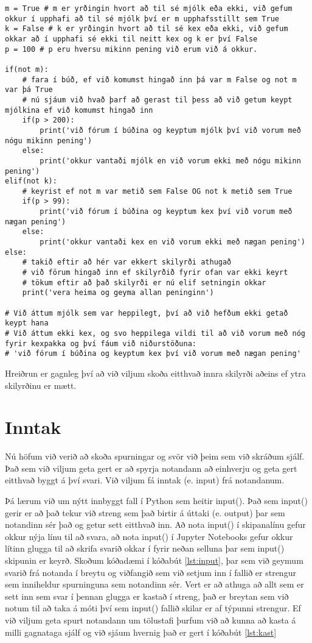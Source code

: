 \begin{lstlisting}[caption=Hreiðrun, label=lst:nesting]
m = True # m er yrðingin hvort að til sé mjólk eða ekki, við gefum okkur í upphafi að til sé mjólk því er m upphafsstillt sem True
k = False # k er yrðingin hvort að til sé kex eða ekki, við gefum okkar að í upphafi sé ekki til neitt kex og k er því False
p = 100 # p eru hversu mikinn pening við erum við á okkur.

if(not m):
	# fara í búð, ef við komumst hingað inn þá var m False og not m var þá True
	# nú sjáum við hvað þarf að gerast til þess að við getum keypt mjólkina ef við komumst hingað inn
	if(p > 200):
		print('við fórum í búðina og keyptum mjólk því við vorum með nógu mikinn pening')
	else:
		print('okkur vantaði mjólk en við vorum ekki með nógu mikinn pening')
elif(not k):
	# keyrist ef not m var metið sem False OG not k metið sem True
	if(p > 99):
		print('við fórum í búðina og keyptum kex því við vorum með nægan pening')
	else:
		print('okkur vantaði kex en við vorum ekki með nægan pening')
else:
	# takið eftir að hér var ekkert skilyrði athugað
	# við förum hingað inn ef skilyrðið fyrir ofan var ekki keyrt
	# tökum eftir að það skilyrði er nú elif setningin okkar
	print('vera heima og geyma allan peninginn')

# Við áttum mjólk sem var heppilegt, því að við hefðum ekki getað keypt hana
# Við áttum ekki kex, og svo heppilega vildi til að við vorum með nóg fyrir kexpakka og því fáum við niðurstöðuna:
# 'við fórum í búðina og keyptum kex því við vorum með nægan pening'
\end{lstlisting}

Hreiðrun er gagnleg því að við viljum skoða eitthvað innra skilyrði aðeins ef ytra skilyrðinu er mætt.

\section{Inntak}
Nú höfum við verið að skoða spurningar og svör við þeim sem við skráðum sjálf.
Það sem við viljum geta gert er að spyrja notandann að einhverju og geta gert eitthvað byggt á því svari.
Við viljum fá inntak (e. input) frá notandanum.

Þá lærum við um nýtt innbyggt fall í Python sem heitir input().
Það sem input() gerir er að það tekur við streng sem það birtir á úttaki (e. output) þar sem notandinn sér það og getur sett eitthvað inn.
Að nota input() í skipanalínu gefur okkur nýja línu til að svara, að nota input() í Jupyter Notebooks gefur okkur lítinn glugga til að skrifa svarið okkar í fyrir neðan selluna þar sem input() skipunin er keyrð.
Skoðum kóðadæmi í kóðabút \ref{lst:input}, þar sem við geymum svarið frá notanda í breytu og viðfangið sem við setjum inn í fallið er strengur sem inniheldur spurninguna sem notandinn sér.
Vert er að athuga að allt sem er sett inn sem svar í þennan glugga er kastað í streng, það er breytan sem við notum til að taka á móti því sem input() fallið skilar er af týpunni strengur.
Ef við viljum geta spurt notandann um tölustafi þurfum við að kunna að kasta á milli gagnataga sjálf og við sjáum hvernig það er gert í kóðabút \ref{lst:kast}


